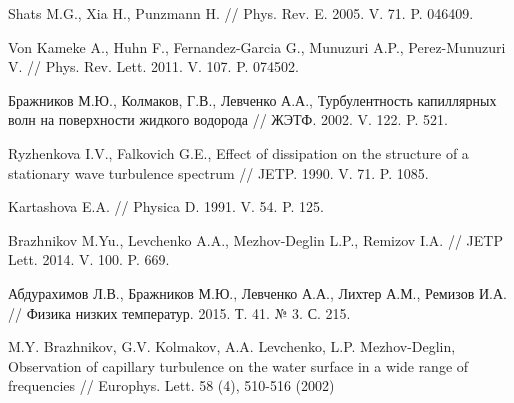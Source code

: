 \begin{thebibliography}{99}
Shats M.G., Xia H., Punzmann H. // Phys. Rev. E. 2005. V. 71. P. 046409.

Von Kameke A., Huhn F., Fernandez-Garcia G., Munuzuri A.P., Perez-Munuzuri V. // Phys. Rev. Lett. 2011. V. 107. P. 074502.



Бражников М.Ю., Колмаков, Г.В., Левченко А.А., Турбулентность капиллярных волн на поверхности жидкого водорода // ЖЭТФ. 2002. V. 122. P. 521.

Ryzhenkova I.V., Falkovich G.E., Effect of dissipation on the structure of a stationary wave turbulence spectrum // JETP. 1990. V. 71. P. 1085.



Kartashova E.A. // Physica D. 1991. V. 54. P. 125.

Brazhnikov M.Yu., Levchenko A.A., Mezhov-Deglin L.P., Remizov I.A. // JETP Lett. 2014. V. 100. P. 669.

Абдурахимов Л.В., Бражников М.Ю., Левченко А.А., Лихтер А.М., Ремизов И.А. // Физика низких температур. 2015. Т. 41. № 3. С. 215.


M.Y. Brazhnikov, G.V. Kolmakov, A.A. Levchenko, L.P. Mezhov-Deglin, Observation of capillary turbulence on the water surface in a wide range of frequencies // Europhys. Lett. 58 (4), 510-516 (2002)



\end{thebibliography}
